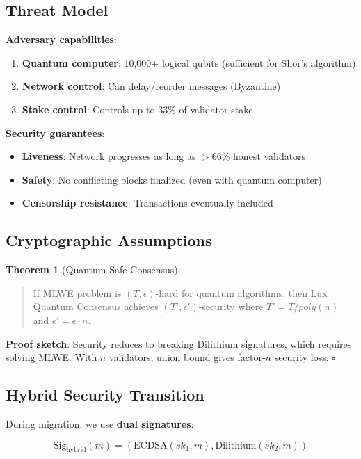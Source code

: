 \documentclass[11pt,letterpaper]{article}
\begin{document}
\subsection{Threat Model}

\textbf{Adversary capabilities}:
\begin{enumerate}
    \item \textbf{Quantum computer}: 10,000+ logical qubits (sufficient for Shor's algorithm)
    \item \textbf{Network control}: Can delay/reorder messages (Byzantine)
    \item \textbf{Stake control}: Controls up to 33\% of validator stake
\end{enumerate}

\textbf{Security guarantees}:
\begin{itemize}
    \item \textbf{Liveness}: Network progresses as long as $>$66\% honest validators
    \item \textbf{Safety}: No conflicting blocks finalized (even with quantum computer)
    \item \textbf{Censorship resistance}: Transactions eventually included
\end{itemize}

\subsection{Cryptographic Assumptions}

\textbf{Theorem 1} (Quantum-Safe Consensus):
\begin{quote}
If MLWE problem is $(T, \epsilon)$-hard for quantum algorithms, then Lux Quantum Consensus achieves $(T', \epsilon')$-security where $T' = T / poly(n)$ and $\epsilon' = \epsilon \cdot n$.
\end{quote}

\textbf{Proof sketch}: Security reduces to breaking Dilithium signatures, which requires solving MLWE. With $n$ validators, union bound gives factor-$n$ security loss. $\square$

\subsection{Hybrid Security Transition}

During migration, we use \textbf{dual signatures}:

\begin{equation}
\text{Sig}_{\text{hybrid}}(m) = (\text{ECDSA}(sk_1, m), \text{Dilithium}(sk_2, m))
\end{equation}
\end{document}
